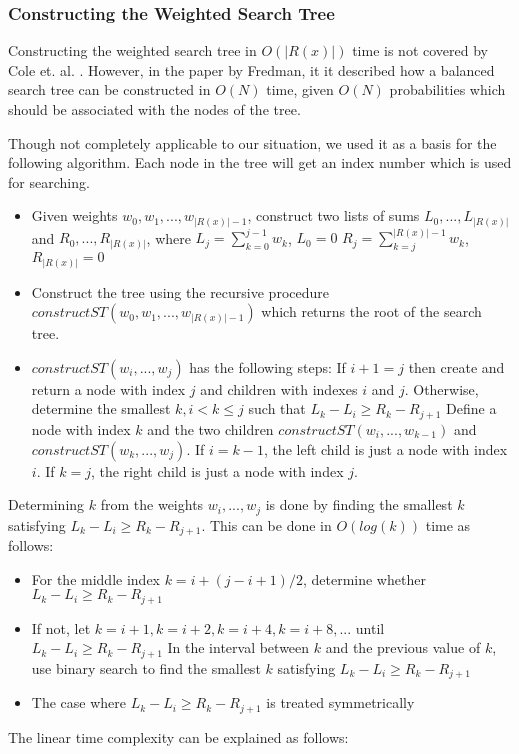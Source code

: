 \subsubsection{Constructing the Weighted Search Tree}
Constructing the weighted search tree in $O(|R(x)|)$ time is not covered by Cole et. al. \cite{nlogn}. However, in the paper \cite{fredman} by Fredman, it it described how a balanced search tree can be constructed in $O(N)$ time, given $O(N)$ probabilities which should be associated with the nodes of the tree.

Though not completely applicable to our situation, we used it as a basis for the following algorithm. Each node in the tree will get an index number which is used for searching.

\begin{itemize}
	\item Given weights ${w_0, w_1, ..., w_{|R(x)|-1}}$, construct two lists of sums ${L_0, ..., L_{|R(x)|}}$ and ${R_0, ..., R_{|R(x)|}}$, where
	\subitem $L_j=\sum_{k=0}^{j-1} w_k$, $L_0=0$
	\subitem $R_j=\sum_{k=j}^{|R(x)|-1} w_k$, $R_{|R(x)|}=0$
	\item Construct the tree using the recursive procedure $constructST(w_0, w_1, ..., w_{|R(x)|-1})$ which returns the root of the search tree.
	\item $constructST(w_i, ..., w_j)$ has the following steps:
	\subitem If $i+1=j$ then create and return a node with index $j$ and children with indexes $i$ and $j$.
	\subitem Otherwise, determine the smallest $k, i<k\le j$ such that
	\subsubitem $L_k-L_i \ge R_k-R_{j+1}$
	\subitem Define a node with index $k$ and the two children $constructST(w_i, ..., w_{k-1})$ and $constructST(w_k, ..., w_j)$.
	\subsubitem If $i=k-1$, the left child is just a node with index $i$.
	\subsubitem If $k=j$, the right child is just a node with index $j$.
\end{itemize}

Determining $k$ from the weights ${w_i, ..., w_j}$ is done by finding the smallest $k$ satisfying $L_k-L_i \ge R_k-R_{j+1}$. This can be done in $O(log(k))$ time as follows:

\begin{itemize}
	\item For the middle index $k=i+(j-i+1)/2$, determine whether $L_k-L_i \ge R_k-R_{j+1}$
	\item If not, let $k=i+1, k=i+2, k=i+4, k=i+8, ...$ until $L_k-L_i \ge R_k-R_{j+1}$
	\subitem In the interval between $k$ and the previous value of $k$, use binary search to find the smallest $k$ satisfying $L_k-L_i \ge R_k-R_{j+1}$
	\item The case where $L_k-L_i \ge R_k-R_{j+1}$ is treated symmetrically\\
\end{itemize}
The linear time complexity can be explained as follows:


